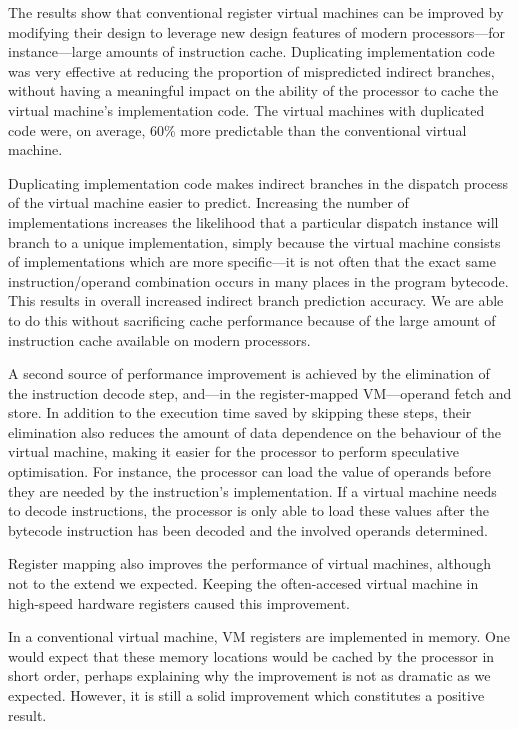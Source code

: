 	The results show that conventional register virtual machines can be improved by modifying their design to leverage new design features of modern processors---for instance---large amounts of instruction cache. Duplicating implementation code was very effective at reducing the proportion of mispredicted indirect branches, without having a meaningful impact on the ability of the processor to cache the virtual machine's implementation code. The virtual machines with duplicated code were, on average, 60\% more predictable than the conventional virtual machine.
	
	Duplicating implementation code makes indirect branches in the dispatch process of the virtual machine easier to predict. Increasing the number of implementations increases the likelihood that a particular dispatch instance will branch to a unique implementation, simply because the virtual machine consists of implementations which are more specific---it is not often that the exact same instruction/operand combination occurs in many places in the program bytecode. This results in overall increased indirect branch prediction accuracy. We are able to do this without sacrificing cache performance because of the large amount of instruction cache available on modern processors.
	
	A second source of performance improvement is achieved by the elimination of the instruction decode step, and---in the register-mapped VM---operand fetch and store. In addition to the execution time saved by skipping these steps, their elimination also reduces the amount of data dependence on the behaviour of the virtual machine, making it easier for the processor to perform speculative optimisation. For instance, the processor can load the value of operands before they are needed by the instruction's implementation. If a virtual machine needs to decode instructions, the processor is only able to load these values after the bytecode instruction has been decoded and the involved operands determined.
	
	Register mapping also improves the performance of virtual machines, although not to the extend we expected. Keeping the often-accesed virtual machine in high-speed hardware registers caused this improvement. 
	
	In a conventional virtual machine, VM registers are implemented in memory. One would expect that these memory locations would be cached by the processor in short order, perhaps explaining why the improvement is not as dramatic as we expected. However, it is still a solid improvement which constitutes a positive result.
	
